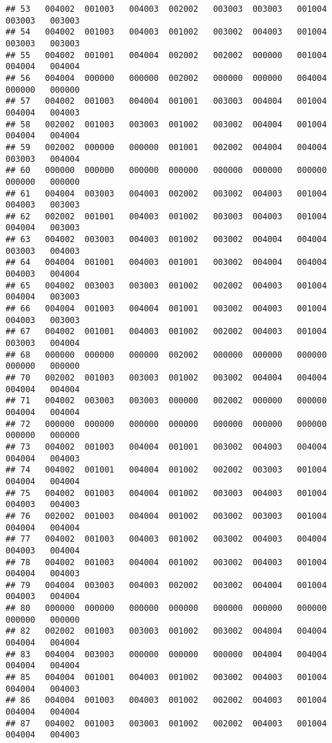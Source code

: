 \documentclass[
]{article}
\begin{document}
\begin{verbatim}
## 53   004002  001003   004003  002002   003003  003003   001004  003003   003003
## 54   004002  001003   004003  001002   003002  004003   001004  003003   003003
## 55   004002  001001   004004  002002   002002  000000   001004  004004   004004
## 56   004004  000000   000000  002002   000000  000000   004004  000000   000000
## 57   004002  001003   004004  001001   003003  004004   001004  004004   004003
## 58   002002  001003   003003  001002   003002  004004   001004  004004   004004
## 59   002002  000000   000000  001001   002002  004004   004004  003003   004004
## 60   000000  000000   000000  000000   000000  000000   000000  000000   000000
## 61   004004  003003   004003  002002   003002  004003   001004  004003   003003
## 62   002002  001001   004003  001002   003003  004003   001004  004004   003003
## 63   004002  003003   004003  001002   003002  004004   004004  003003   004003
## 64   004004  001001   004003  001001   003002  004004   004004  004003   004004
## 65   004002  003003   003003  001002   002002  004003   001004  004004   003003
## 66   004004  001003   004004  001001   003002  004003   001004  004003   003003
## 67   004002  001001   004003  001002   002002  004003   001004  003003   004004
## 68   000000  000000   000000  002002   000000  000000   000000  000000   000000
## 70   002002  001003   003003  001002   003002  004004   004004  004004   004004
## 71   004002  003003   003003  000000   002002  000000   000000  004004   004004
## 72   000000  000000   000000  000000   000000  000000   000000  000000   000000
## 73   004002  001003   004004  001001   003002  004003   004004  004004   004003
## 74   004002  001001   004004  001002   002002  003003   001004  004004   004004
## 75   004002  001003   004004  001002   003003  004003   001004  004003   004003
## 76   002002  001003   004004  001002   003002  003003   001004  004004   004004
## 77   004002  001003   004003  001002   003002  004003   004004  004003   004004
## 78   004002  001003   004004  001002   003002  004003   001004  004004   004003
## 79   004004  003003   004003  002002   003002  004004   001004  004003   004004
## 80   000000  000000   000000  000000   000000  000000   000000  000000   000000
## 82   002002  001003   003003  001002   003002  004004   004004  004004   004004
## 83   004004  003003   000000  000000   000000  004004   004004  004004   004004
## 85   004004  001001   004003  001002   003002  004003   001004  004004   004003
## 86   004004  001003   004003  001002   002002  004003   001004  004004   004004
## 87   004002  001003   003003  001002   002002  004003   001004  004004   004003

\end{verbatim}
\end{document}
